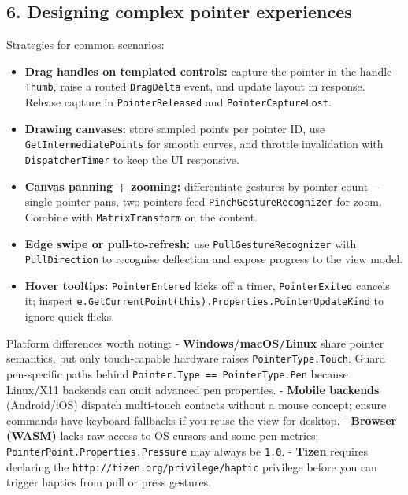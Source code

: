 \subsection{6. Designing complex pointer
experiences}\label{designing-complex-pointer-experiences}

Strategies for common scenarios:

\begin{itemize}
\tightlist
\item
  \textbf{Drag handles on templated controls:} capture the pointer in
  the handle \passthrough{\lstinline!Thumb!}, raise a routed
  \passthrough{\lstinline!DragDelta!} event, and update layout in
  response. Release capture in \passthrough{\lstinline!PointerReleased!}
  and \passthrough{\lstinline!PointerCaptureLost!}.
\item
  \textbf{Drawing canvases:} store sampled points per pointer ID, use
  \passthrough{\lstinline!GetIntermediatePoints!} for smooth curves, and
  throttle invalidation with \passthrough{\lstinline!DispatcherTimer!}
  to keep the UI responsive.
\item
  \textbf{Canvas panning + zooming:} differentiate gestures by pointer
  count---single pointer pans, two pointers feed
  \passthrough{\lstinline!PinchGestureRecognizer!} for zoom. Combine
  with \passthrough{\lstinline!MatrixTransform!} on the content.
\item
  \textbf{Edge swipe or pull-to-refresh:} use
  \passthrough{\lstinline!PullGestureRecognizer!} with
  \passthrough{\lstinline!PullDirection!} to recognise deflection and
  expose progress to the view model.
\item
  \textbf{Hover tooltips:} \passthrough{\lstinline!PointerEntered!}
  kicks off a timer, \passthrough{\lstinline!PointerExited!} cancels it;
  inspect
  \passthrough{\lstinline!e.GetCurrentPoint(this).Properties.PointerUpdateKind!}
  to ignore quick flicks.
\end{itemize}

Platform differences worth noting: - \textbf{Windows/macOS/Linux} share
pointer semantics, but only touch-capable hardware raises
\passthrough{\lstinline!PointerType.Touch!}. Guard pen-specific paths
behind \passthrough{\lstinline!Pointer.Type == PointerType.Pen!} because
Linux/X11 backends can omit advanced pen properties. - \textbf{Mobile
backends} (Android/iOS) dispatch multi-touch contacts without a mouse
concept; ensure commands have keyboard fallbacks if you reuse the view
for desktop. - \textbf{Browser (WASM)} lacks raw access to OS cursors
and some pen metrics;
\passthrough{\lstinline!PointerPoint.Properties.Pressure!} may always be
\passthrough{\lstinline!1.0!}. - \textbf{Tizen} requires declaring the
\passthrough{\lstinline!http://tizen.org/privilege/haptic!} privilege
before you can trigger haptics from pull or press gestures.

